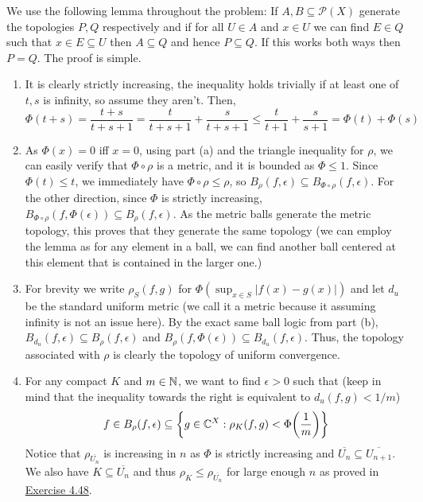 \documentclass[12pt,a4paper]{article}
\begin{document}
\begin{solution}
    We use the following lemma throughout the problem: If $A,B \subseteq \mathcal P(X)$ generate the topologies $P,Q$ respectively and if for all $U\in A$ and $x\in U$ we can find $E\in Q$ such that $x\in E \subseteq U$ then $A \subseteq Q$ and hence $P \subseteq Q$. 
    If this works both ways then $P=Q$. 
    The proof is simple. 
\begin{enumerate}[label=\alph*.]
    \item It is clearly strictly increasing, the inequality holds trivially if at least one of $t,s$ is infinity, so assume they aren't. 
        Then, 
        \[
            \Phi(t+s) = \frac{t+s}{t+s+1} = \frac{t}{t+s+1} + \frac{s}{t+s+1} \leq \frac{t}{t+1} + \frac{s}{s+1} = \Phi(t) + \Phi(s)
        \]
    \item As $\Phi(x)=0$ iff $x=0$, using part (a) and the triangle inequality for $\rho$, we can easily verify that $\Phi\circ\rho$ is a metric, and it is bounded as $\Phi \leq 1$. 
        Since $\Phi(t) \le t$, we immediately have $\Phi\circ\rho \leq \rho$, so $B_\rho(f, \epsilon) \subseteq B_{\Phi \circ \rho}(f, \epsilon)$. 
        For the other direction, since $\Phi$ is strictly increasing, $B_{\Phi \circ \rho}(f, \Phi(\epsilon)) \subseteq B_\rho(f, \epsilon)$. 
        As the metric balls generate the metric topology, this proves that they generate the same topology (we can employ the lemma as for any element in a ball, we can find another ball centered at this element that is contained in the larger one.) 
    \item For brevity we write $\rho_S(f,g)$ for $\Phi(\sup_{x\in S}|f(x)-g(x)|)$ and let $d_u$ be the standard uniform metric (we call it a metric because it assuming infinity is not an issue here). 
        By the exact same ball logic from part (b), $B_{d_u}(f, \epsilon) \subseteq B_{\rho}(f, \epsilon)$ and $B_{\rho}(f, \Phi(\epsilon)) \subseteq B_{d_u}(f, \epsilon)$.
        Thus, the topology associated with $\rho$ is clearly the topology of uniform convergence.
    \item For any compact $K$ and $m\in\mathbb{N}$, we want to find $\epsilon>0$ such that (keep in mind that the inequality towards the right is equivalent to $d_u(f,g)<1/m$) 
        \[
            f\in B_\rho(f,\epsilon) \subseteq\qty{g\in\mathbb{C}^X:\rho_K(f,g)< \Phi\qty(\frac{1}{m})}
        \]
        Notice that $\rho_{ \overline{U_n}}$ is increasing in $n$ as $\Phi$ is strictly increasing and $ \overline{U_n} \subseteq \overline{U_{n+1}}$. 
        We also have $K \subseteq \overline{U_n}$ and thus $\rho_K\leq\rho_{ \overline{U_n}}$ for large enough $n$ as proved in \hyperref[prob:4-48]{Exercise 4.48}. 

\end{enumerate}
\end{solution}
\end{document}
